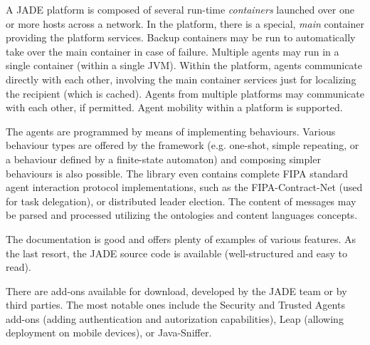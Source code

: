 \documentclass[a4paper]{report}
\begin{document}
A JADE platform is composed of several run-time \textsl{containers} launched over one or more hosts across a network. In the platform, there is a special, \textsl{main} container providing the platform services. Backup containers may be run to automatically take over the main container in case of failure. Multiple agents may run in a single container (within a single JVM). Within the platform, agents communicate directly with each other, involving the main container services just for localizing the recipient (which is cached). Agents from multiple platforms may communicate with each other, if permitted. Agent mobility within a platform is supported.

The agents are programmed by means of implementing behaviours. Various behaviour types are offered by the framework (e.g. one-shot, simple repeating, or a behaviour defined by a finite-state automaton) and composing simpler behaviours is also possible. The library even contains complete FIPA standard agent interaction protocol implementations, such as the FIPA-Contract-Net (used for task delegation), or distributed leader election. The content of messages may be parsed and processed utilizing the ontologies and content languages concepts.

The documentation is good and offers plenty of examples of various features. As the last resort, the JADE source code is available (well-structured and easy to read).

There are add-ons available for download, developed by the JADE team or by third parties. The most notable ones include the Security and Trusted Agents add-ons (adding authentication and autorization capabilities), Leap (allowing deployment on mobile devices), or Java-Sniffer.
\end{document}

